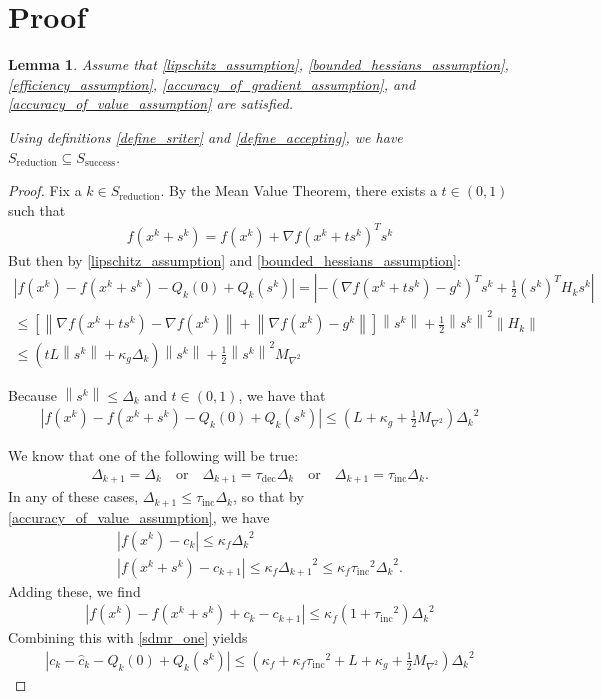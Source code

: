 \documentclass{article}
\newtheorem{lemma}[theorem]{Lemma}
\theoremstyle{case}
\newcommand{\xk}{{x^k}}
\newcommand{\qk}{{Q_k}}
\newcommand{\ck}{{c_k}}
\newcommand{\gk}{{g^k}}
\newcommand{\hk}{{H_k}}
\newcommand{\dk}{{\Delta_k}}
\newcommand{\sk}{{s^k}}
\newcommand{\lip}{{L}}
\newcommand{\dkpo}{{\Delta_{k+1}}}
\newcommand{\ckpo}{{c_{k+1}}}
\newcommand{\ctrialk}{{\hat c_k}}
\newcommand{\kappaf}{{\kappa_{f}}}
\newcommand{\kappag}{{\kappa_{g}}}
\newcommand{\gradfk}{{\nabla f \left(\xk\right)}}
\newcommand{\maxhes}{{M_{\nabla^2}}}
\newcommand{\tinc}{{\tau_{\text{inc}}}}
\newcommand{\tdec}{{\tau_{\text{dec}}}}
\newcommand{\success}{{S_{\text{success}}}}
\newcommand{\sriter}{{S_{\text{reduction}}}}
\begin{document}
\section{Proof}

\begin{lemma}
\label{small_delta_means_reduction}
Assume that
\cref{lipschitz_assumption},
\cref{bounded_hessians_assumption},
\cref{efficiency_assumption},
\cref{accuracy_of_gradient_assumption},
and \cref{accuracy_of_value_assumption}
are satisfied.

Using definitions \cref{define_sriter} and \cref{define_accepting}, we have $\sriter \subseteq \success$.
\end{lemma}

\begin{proof}
Fix a $k \in \sriter$.
By the Mean Value Theorem, there exists a $t \in (0, 1)$ such that
\begin{align*}
f(\xk + \sk) = f(\xk) + \nabla f(\xk + t \sk)^T \sk
\end{align*}
But then by \cref{lipschitz_assumption} and \cref{bounded_hessians_assumption}:
\begin{align*}
\left| f(\xk) - f(\xk + \sk) - \qk(0) + \qk(\sk) \right| = \left| -\left(\nabla f\left(\xk + t \sk\right) - \gk \right)^T \sk + \frac 1 2 \left(\sk\right)^T\hk\sk\right| \\
\le \left[\left\|\nabla f(\xk + t \sk) - \gradfk\right\| + \left\|\gradfk - \gk \right\|\right]\left\|\sk\right\| + \frac 1 2 \left\|\sk\right\|^2 \left\|\hk\right\| \\
\le \left(t \lip \left\|\sk\right\| + \kappag \dk\right)\left\|\sk\right\| + \frac 1 2 \left\|\sk\right\|^2 \maxhes
\end{align*}

Because $\left\|\sk\right\| \le \dk$ and $t \in (0, 1)$, we have that
\begin{align}
\left| f(\xk) - f(\xk + \sk) - \qk(0) + \qk(\sk) \right|  \le \left(L + \kappag + \frac 1 2 \maxhes\right) \dk^2 \label{sdmr_one}
\end{align}

We know that one of the following will be true:
\begin{align*}
\dkpo = \dk \quad \textrm{or} \quad  \dkpo = \tdec\dk \quad \textrm{or} \quad \dkpo = \tinc\dk.
\end{align*}
In any of these cases, $\dkpo \le \tinc \dk$, so that by \cref{accuracy_of_value_assumption}, we have
\begin{align*}
\left| f(\xk) - \ck \right| \le \kappaf \dk^2 \\
\left| f(\xk + \sk)  - \ckpo \right| \le \kappaf \dkpo^2 \le \kappaf \tinc^2 \dk^2.
\end{align*}
Adding these, we find
\begin{align*}
\left| f(\xk) - f(\xk + \sk) + \ck - \ckpo \right| \le \kappaf\left(1 + \tinc^2\right)\dk^2
\end{align*}
Combining this with \cref{sdmr_one} yields
\begin{align}
\left| \ck - \ctrialk - \qk(0) + \qk(\sk) \right| \le \left(\kappaf + \kappaf\tinc^2 + L + \kappag + \frac 1 2 \maxhes\right)\dk^2 \label{sdmr_two}
\end{align}



\end{proof}
\end{document}
